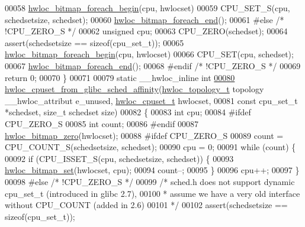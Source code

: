 \begin{DoxyCode}
00058   \hyperlink{a00065_ga3f6861045a8029ade373510ffa727d2a}{hwloc_bitmap_foreach_begin}(cpu, hwlocset)
00059     CPU\_SET\_S(cpu, schedsetsize, schedset);
00060   \hyperlink{a00065_gafcf3246db406218d4e155735b3fa6528}{hwloc_bitmap_foreach_end}();
00061 \textcolor{preprocessor}{#else }\textcolor{comment}{/* !CPU\_ZERO\_S */}
00062   \textcolor{keywordtype}{unsigned} cpu;
00063   CPU\_ZERO(schedset);
00064   assert(schedsetsize == \textcolor{keyword}{sizeof}(cpu\_set\_t));
00065   \hyperlink{a00065_ga3f6861045a8029ade373510ffa727d2a}{hwloc_bitmap_foreach_begin}(cpu, hwlocset)
00066     CPU\_SET(cpu, schedset);
00067   \hyperlink{a00065_gafcf3246db406218d4e155735b3fa6528}{hwloc_bitmap_foreach_end}();
00068 \textcolor{preprocessor}{#endif }\textcolor{comment}{/* !CPU\_ZERO\_S */}
00069   \textcolor{keywordflow}{return} 0;
00070 \}
00071 
00079 \textcolor{keyword}{static} \_\_hwloc\_inline \textcolor{keywordtype}{int}
\hypertarget{a00030_source_l00080}{}\hyperlink{a00066_ga6df504b2f5440b527be05cdad6b1655e}{00080} \hyperlink{a00066_ga6df504b2f5440b527be05cdad6b1655e}{hwloc_cpuset_from_glibc_sched_affinity}(\hyperlink{a00039_ga9d1e76ee15a7dee158b786c30b6a6e38}{hwloc_topology_t} topology \_\_hwloc\_attribut
      e\_unused, \hyperlink{a00040_ga4bbf39b68b6f568fb92739e7c0ea7801}{hwloc_cpuset_t} hwlocset,
00081                                        \textcolor{keyword}{const} cpu\_set\_t *schedset, \textcolor{keywordtype}{size\_t} schedset
      size)
00082 \{
00083   \textcolor{keywordtype}{int} cpu;
00084 \textcolor{preprocessor}{#ifdef CPU\_ZERO\_S}
00085 \textcolor{preprocessor}{}  \textcolor{keywordtype}{int} count;
00086 \textcolor{preprocessor}{#endif}
00087 \textcolor{preprocessor}{}  \hyperlink{a00065_ga6c540b9fe63b8223b6aba46d56dd63b8}{hwloc_bitmap_zero}(hwlocset);
00088 \textcolor{preprocessor}{#ifdef CPU\_ZERO\_S}
00089 \textcolor{preprocessor}{}  count = CPU\_COUNT\_S(schedsetsize, schedset);
00090   cpu = 0;
00091   \textcolor{keywordflow}{while} (count) \{
00092     \textcolor{keywordflow}{if} (CPU\_ISSET\_S(cpu, schedsetsize, schedset)) \{
00093       \hyperlink{a00065_ga497556af0cc34f109ae0277999c074d3}{hwloc_bitmap_set}(hwlocset, cpu);
00094       count--;
00095     \}
00096     cpu++;
00097   \}
00098 \textcolor{preprocessor}{#else }\textcolor{comment}{/* !CPU\_ZERO\_S */}
00099   \textcolor{comment}{/* sched.h does not support dynamic cpu\_set\_t (introduced in glibc 2.7),}
00100 \textcolor{comment}{   * assume we have a very old interface without CPU\_COUNT (added in 2.6)}
00101 \textcolor{comment}{   */}
00102   assert(schedsetsize == \textcolor{keyword}{sizeof}(cpu\_set\_t));

\end{DoxyCode}
